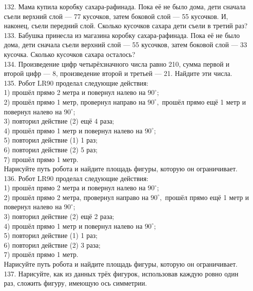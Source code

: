 \documentclass[12pt]{article}
\begin{document}
132. Мама купила коробку сахара-рафинада. Пока её не было дома, дети сначала съели верхний слой --- 77 кусочков, затем боковой слой --- 55 кусочков. И, наконец, съели передний слой. Сколько кусочков сахара дети съели в третий раз?\\
133. Бабушка принесла из магазина коробку сахара-рафинада. Пока её не было дома, дети сначала съели верхний слой --- 55 кусочков, затем боковой слой --- 33 кусочка. Сколько кусочков сахара осталось?\\
134. Произведение цифр четырёхзначного числа равно 210, сумма первой и второй цифр --- 8, произведение второй и третьей --- 21. Найдите эти числа.\\
135. Робот LR90 проделал следующие действия:\\
1) прошёл прямо 2 метра и повернул налево на $90^\circ$;\\
2) прошёл прямо 1 метр, провернул направо на $90^\circ,$ прошёл прямо ещё 1 метр и повернул налево на $90^\circ$;\\
3) повторил действие (2) ещё 4 раза;\\
4) прошёл прямо 1 метр и повернул налево на $90^\circ$;\\
5) повторил действие (1) 1 раз;\\
6) повторил действие (2) 5 раз;\\
7) прошёл прямо 1 метр.\\
Нарисуйте путь робота и найдите площадь фигуры, которую он ограничивает.\\
136. Робот LR90 проделал следующие действия:\\
1) прошёл прямо 2 метра и повернул налево на $90^\circ$;\\
2) прошёл прямо 2 метра, провернул направо на $90^\circ,$ прошёл прямо ещё 1 метр и повернул налево на $90^\circ$;\\
3) повторил действие (2) ещё 2 раза;\\
4) прошёл прямо 1 метр и повернул налево на $90^\circ$;\\
5) повторил действие (1) 1 раз;\\
6) повторил действие (2) 3 раза;\\
7) прошёл прямо 1 метр.\\
Нарисуйте путь робота и найдите площадь фигуры, которую он ограничивает.\\
137. Нарисуйте, как из данных трёх фигурок, использовав каждую ровно один раз, сложить фигуру, имеющую ось симметрии.
\begin{center}
\begin{figure}[ht!]
\end{figure}
\end{center}
\end{document}
